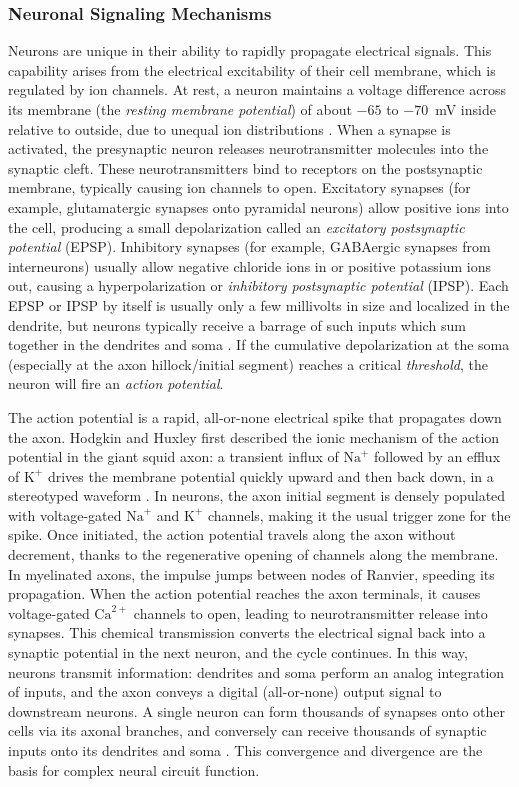\documentclass[final, a4paper,masters,en,listoffigures,listoftables,norwegiandates]{NMBU}
\begin{document}
\subsubsection{Neuronal Signaling Mechanisms} Neurons are unique in their ability to rapidly propagate electrical signals. This capability arises from the electrical excitability of their cell membrane, which is regulated by ion channels. At rest, a neuron maintains a voltage difference across its membrane (the \textit{resting membrane potential}) of about $-65$ to $-70$~mV inside relative to outside, due to unequal ion distributions \cite{kandel2021principles}. When a synapse is activated, the presynaptic neuron releases neurotransmitter molecules into the synaptic cleft. These neurotransmitters bind to receptors on the postsynaptic membrane, typically causing ion channels to open. Excitatory synapses (for example, glutamatergic synapses onto pyramidal neurons) allow positive ions into the cell, producing a small depolarization called an \textit{excitatory postsynaptic potential} (EPSP). Inhibitory synapses (for example, GABAergic synapses from interneurons) usually allow negative chloride ions in or positive potassium ions out, causing a hyperpolarization or \textit{inhibitory postsynaptic potential} (IPSP). Each EPSP or IPSP by itself is usually only a few millivolts in size and localized in the dendrite, but neurons typically receive a barrage of such inputs which sum together in the dendrites and soma \cite{Dayan2001}. If the cumulative depolarization at the soma (especially at the axon hillock/initial segment) reaches a critical \textit{threshold}, the neuron will fire an \textit{action potential}.

The action potential is a rapid, all-or-none electrical spike that propagates down the axon. Hodgkin and Huxley first described the ionic mechanism of the action potential in the giant squid axon: a transient influx of $\text{Na}^+$ followed by an efflux of $\text{K}^+$ drives the membrane potential quickly upward and then back down, in a stereotyped waveform \cite{hodgkin1952quantitative}. In neurons, the axon initial segment is densely populated with voltage-gated $\text{Na}^+$ and $\text{K}^+$ channels, making it the usual trigger zone for the spike. Once initiated, the action potential travels along the axon without decrement, thanks to the regenerative opening of channels along the membrane. In myelinated axons, the impulse jumps between nodes of Ranvier, speeding its propagation. When the action potential reaches the axon terminals, it causes voltage-gated $\text{Ca}^{2+}$ channels to open, leading to neurotransmitter release into synapses. This chemical transmission converts the electrical signal back into a synaptic potential in the next neuron, and the cycle continues. In this way, neurons transmit information: dendrites and soma perform an analog integration of inputs, and the axon conveys a digital (all-or-none) output signal to downstream neurons. A single neuron can form thousands of synapses onto other cells via its axonal branches, and conversely can receive thousands of synaptic inputs onto its dendrites and soma \cite{kandel2021principles,Dayan2001}. This convergence and divergence are the basis for complex neural circuit function.
\end{document}
